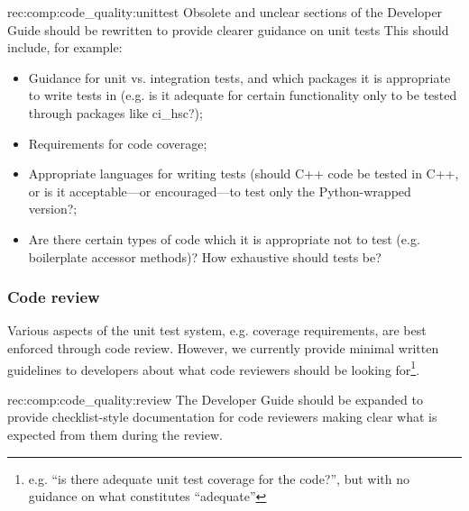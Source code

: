 \begin{recommendation}
    {rec:comp:code_quality:unittest}
    {Obsolete and unclear sections of the Developer Guide should be rewritten to provide clearer guidance on unit tests}
    This should include, for example:
\begin{itemize}

  \item{Guidance for unit vs. integration tests, and which packages it is appropriate to write tests in (e.g. is it adequate for certain functionality only to be tested through packages like ci\_hsc?);}
  \item{Requirements for code coverage;}
  \item{Appropriate languages for writing tests (should C++ code be tested in C++, or is it acceptable---or encouraged---to test only the Python-wrapped version?;}
  \item{Are there certain types of code which it is appropriate not to test (e.g. boilerplate accessor methods)? How exhaustive should tests be?}

\end{itemize}

\end{recommendation}

\subsubsection{Code review}
\label{sec:comp:code_quality:review}

Various aspects of the unit test system, e.g. coverage requirements, are best enforced through code review.
However, we currently provide minimal written guidelines to developers about what code reviewers should be looking for\footnote{e.g. ``is there adequate unit test coverage for the code?'', but with no guidance on what constitutes ``adequate''}.

\begin{recommendation}
    {rec:comp:code_quality:review}
    {The Developer Guide should be expanded to provide checklist-style documentation for code reviewers making clear what is expected from them
during the review.}
\end{recommendation}

